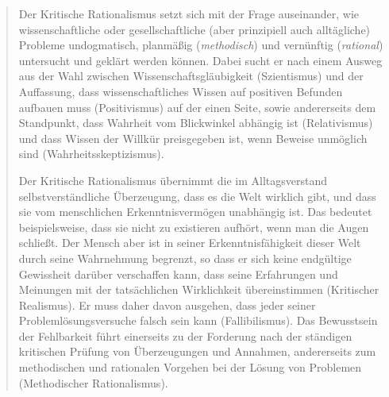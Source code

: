 \begin{quote}\small
  Der Kritische Rationalismus setzt sich mit der Frage auseinander, wie wissenschaftliche oder gesellschaftliche (aber prinzipiell auch alltägliche) Probleme undogmatisch, planmäßig (\textit{methodisch}) und vernünftig (\textit{rational}) untersucht und geklärt werden können. Dabei sucht er nach einem Ausweg aus der Wahl zwischen Wissenschaftsgläubigkeit (Szientismus) und der Auffassung, dass wissenschaftliches Wissen auf positiven Befunden aufbauen muss (Positivismus) auf der einen Seite, sowie andererseits dem Standpunkt, dass Wahrheit vom Blickwinkel abhängig ist (Relativismus) und dass Wissen der Willkür preisgegeben ist, wenn Beweise unmöglich sind (Wahrheitsskeptizismus).

Der Kritische Rationalismus übernimmt die im Alltagsverstand selbstverständliche Überzeugung, dass es die Welt wirklich gibt, und dass sie vom menschlichen Erkenntnis­vermögen unabhängig ist. Das bedeutet beispielsweise, dass sie nicht zu existieren aufhört, wenn man die Augen schließt. Der Mensch aber ist in seiner Erkenntnisfähigkeit dieser Welt durch seine Wahrnehmung begrenzt, so dass er sich keine endgültige Gewissheit darüber verschaffen kann, dass seine Erfahrungen und Meinungen mit der tatsächlichen Wirklichkeit übereinstimmen (Kritischer Realismus). Er muss daher davon ausgehen, dass jeder seiner Problemlösungsversuche falsch sein kann (Fallibilismus). Das Bewusstsein der Fehlbarkeit führt einerseits zu der Forderung nach der ständigen kritischen Prüfung von Überzeugungen und Annahmen, andererseits zum methodischen und rationalen Vorgehen bei der Lösung von Problemen (Methodischer Rationalismus).
\end{quote}
